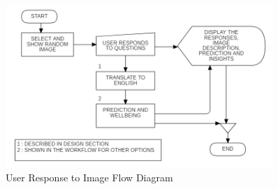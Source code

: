 \begin{figure}[h!]  
    \centering
    \includegraphics[width=0.9\textwidth]{Images/APP RESPOND.png}  
    \caption{User Response to Image Flow Diagram}
    \label{01234i}  %
\end{figure}

\pagebreak


